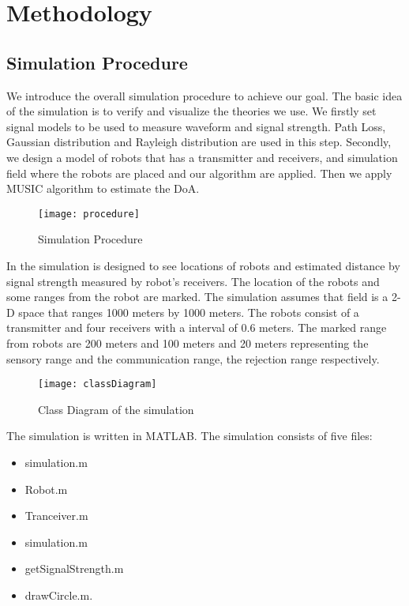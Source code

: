 \section{Methodology}
\subsection{Simulation Procedure}
We introduce the overall simulation procedure to achieve our goal. The basic idea of the simulation is to verify and visualize the theories we use. We firstly set signal models to be used to measure waveform and signal strength. Path Loss, Gaussian distribution and Rayleigh distribution are used in this step. Secondly, we design a model of robots that has a transmitter and receivers, and simulation field where the robots are placed and our algorithm are applied. Then we apply MUSIC algorithm to estimate the DoA.

\begin{figure}[h]
	\begin{minipage}[t]{0.3\linewidth}
	\centering
	\texttt{[image: procedure]}
	\caption{Simulation Procedure}
	\end{minipage}
\end{figure}
	
In the simulation is designed to see locations of robots and estimated distance by signal strength measured by robot's receivers. The location of the robots and some ranges from the robot are marked. The simulation assumes that field is a 2-D space that ranges 1000 meters by 1000 meters. The robots consist of a transmitter and four receivers with a interval of 0.6 meters. The marked range from robots are 200 meters and 100 meters and 20 meters representing the sensory range and the communication range, the rejection range respectively.

\begin{figure}[h]
	\begin{minipage}[t]{0.3\linewidth}
	\centering
	\texttt{[image: classDiagram]}
	\caption{Class Diagram of the simulation}
	\end{minipage}
\end{figure}


The simulation is written in MATLAB. The simulation consists of five files: 
\begin{itemize}
	\item simulation.m
	\item Robot.m
	\item Tranceiver.m
	\item simulation.m
	\item getSignalStrength.m
	\item drawCircle.m.
\end{itemize}

